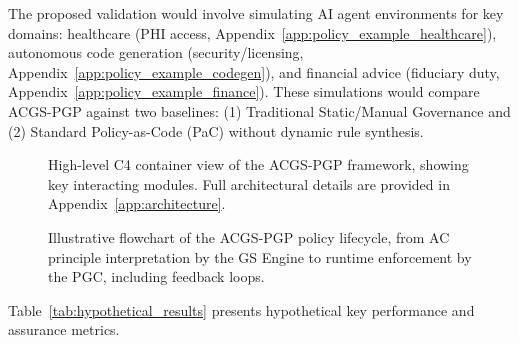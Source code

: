 \documentclass[sigconf,review,anonymous=false]{acmart} %
\begin{document}
The proposed validation would involve simulating AI agent environments for key domains: healthcare (PHI access, Appendix~\ref{app:policy_example_healthcare}), autonomous code generation (security/licensing, Appendix~\ref{app:policy_example_codegen}), and financial advice (fiduciary duty, Appendix~\ref{app:policy_example_finance}). These simulations would compare ACGS-PGP against two baselines: (1) Traditional Static/Manual Governance and (2) Standard Policy-as-Code (PaC) without dynamic rule synthesis.

\begin{figure}[t]
  \centering
  \caption{High-level C4 container view of the ACGS-PGP framework, showing key interacting modules. Full architectural details are provided in Appendix~\ref{app:architecture}.}
  \label{fig:c4_architecture}
\end{figure}

\begin{figure}[t]
  \centering
  \caption{Illustrative flowchart of the ACGS-PGP policy lifecycle, from AC principle interpretation by the GS Engine to runtime enforcement by the PGC, including feedback loops.}
  \label{fig:policy_flowchart}
\end{figure}

Table~\ref{tab:hypothetical_results} presents hypothetical key performance and assurance metrics.
\end{document}
